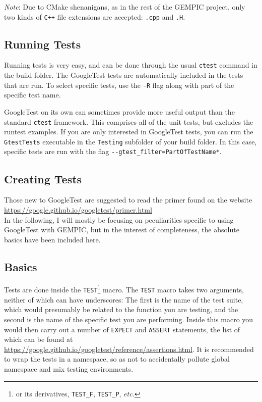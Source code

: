 \documentclass[11pt]{article}
\newcommand{\gt}{GoogleTest}
\newcommand{\ctest}{\texttt{ctest}}
\begin{document}
\emph{Note}: Due to CMake shenanigans, as in the rest of the GEMPIC project, only two kinds of \verb|C++| file extensions are accepted: \verb|.cpp| and \verb|.H|.

\subsection{Running Tests}
Running tests is very easy, and can be done through the usual \ctest{} command in the build folder. The \gt{} tests are automatically included in the tests that are run.
To select specific tests, use the \verb|-R| flag along with part of the specific test name.

\gt{} on its own can sometimes provide more useful output than the standard \ctest{} framework. This comprises all of the unit tests, but excludes the runtest examples. If you are only interested in \gt{} tests, you can run the \verb|GtestTests| executable in the \verb|Testing| subfolder of your build folder. In this case, specific tests are run with the flag \verb|--gtest_filter=PartOfTestName*|.

\subsection{Creating Tests}
Those new to \gt{} are suggested to read the primer found on the website\\\url{https://google.github.io/googletest/primer.html}\\
In the following, I will mostly be focusing on peculiarities specific to using \gt{} with GEMPIC, but in the interest of completeness, the absolute basics have been included here.
\subsection{Basics}
Tests are done inside the \lstinline{TEST}\footnote{or its derivatives, \lstinline{TEST_F}, \lstinline{TEST_P}, \emph{etc.}} macro.
 The \lstinline{TEST} macro takes two arguments, neither of which can have underscores: The first is the name of the test suite, which would presumably be related to the function you are testing, and the second is the name of the specific test you are performing. Inside this macro you would then carry out a number of \lstinline{EXPECT} and \lstinline{ASSERT} statements, the list of which can be found at \url{https://google.github.io/googletest/reference/assertions.html}.
 It is recommended to wrap the tests in a namespace, so as not to accidentally pollute global namespace and mix testing environments.
\end{document}
